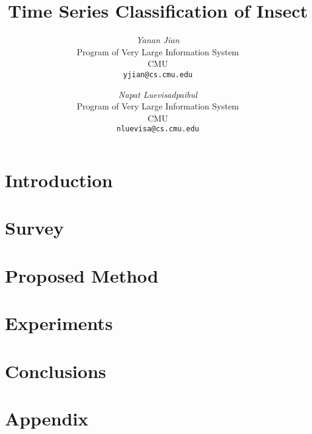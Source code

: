 \documentclass[12pt]{article}
\begin{document}
\newcommand{\beq}{\begin{equation}}
\newcommand{\eeq}{\end{equation}}
\newcommand{\bit}{\begin{itemize*}}
\newcommand{\eit}{\end{itemize*}}
\newcommand{\goal}[1]{ {\noindent {$\Rightarrow$} \em {#1} } }
\newcommand{\hide}[1]{}
\newcommand{\comment}[1]{ {\footnotesize {#1} } }
\newtheorem{lemma}{Lemma}
\newtheorem{theorem}{Theorem}
\newtheorem{proof}{Proof}
\newtheorem{defn}{Definition}
\newtheorem{algo}{Algorithm}
\newtheorem{observation}{Observation}

\title{Time Series Classification of Insect}


\author{ {\em Yanan Jian} \\
	    Program of Very Large Information System \\
	    CMU\\
	    {\tt yjian@cs.cmu.edu}
	 \and
	 {\em Napat Luevisadpaibul} \\
	    Program of Very Large Information System \\
	    CMU\\
	     {\tt nluevisa@cs.cmu.edu}
}

\maketitle
\begin{abstract}
    
\end{abstract}

\section{Introduction}
    \label{sec:intro}
    

\section{Survey}
    \label{sec:survey}
    

\section{Proposed Method}
    \label{sec:proposed}
    


\section{Experiments}
    \label{sec:experiments}
    

\section{Conclusions}
    \label{sec:conclusions}
    



    


\newpage
\appendix
\section{Appendix}


\newpage
{}
\tableofcontents
\end{document}
